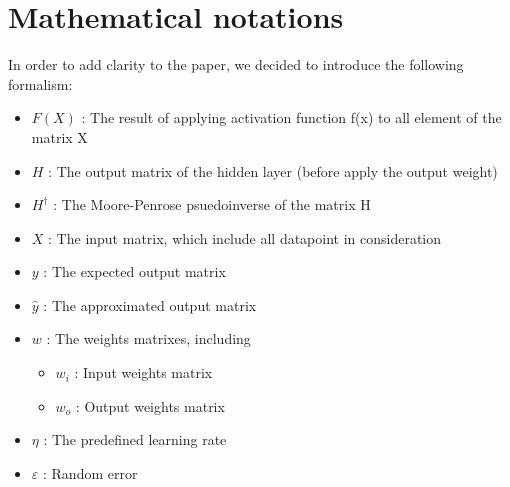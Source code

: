\documentclass[13pt]{article}
\begin{document}
\section*{Mathematical notations}
In order to add clarity to the paper, we decided to introduce the following formalism:
\begin{itemize}
    \item $F(X)$ : The result of applying activation function f(x) to all element of the matrix X
    \item $H$ : The output matrix of the hidden layer (before apply the output weight)
    \item $H^\dagger$ : The Moore-Penrose psuedoinverse of the matrix H
    \item $X$ : The input matrix, which include all datapoint in consideration
    \item $y$ : The expected output matrix
    \item $\hat{y}$ : The approximated output matrix
    \item $w$ : The weights matrixes, including
    \begin{itemize}
        \item $w_i$ : Input weights matrix
        \item $w_o$ : Output weights matrix
    \end{itemize}
    \item $\eta$ : The predefined learning rate
    \item $\varepsilon$ : Random error
\end{itemize}
\newpage
\end{document}
